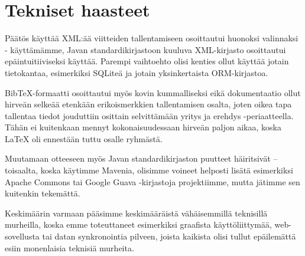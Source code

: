 \documentclass{article}
\begin{document}
\section{Tekniset haasteet}

Päätös käyttää XML:ää viitteiden tallentamiseen osoittautui huonoksi valinnaksi - käyttämämme, Javan standardikirjastoon kuuluva XML-kirjasto osoittautui epäintuitiiviseksi käyttää. Parempi vaihtoehto olisi kenties ollut käyttää jotain tietokantaa, esimerkiksi SQLiteä ja jotain yksinkertaista ORM-kirjastoa.

BibTeX-formaatti osoittautui myös kovin kummalliseksi eikä dokumentaatio ollut hirveän selkeää etenkään erikoismerkkien tallentamisen osalta, joten oikea tapa tallentaa tiedot jouduttiin osittain selvittämään yritys ja erehdys -periaatteella. Tähän ei kuitenkaan mennyt kokonaisuudessaan hirveän paljon aikaa, koska LaTeX oli ennestään tuttu osalle ryhmästä.

Muutamaan otteeseen myös Javan standardikirjaston puutteet häiritsivät -- toisaalta, koska käytimme Mavenia, olisimme voineet helposti lisätä esimerkiksi Apache Commons tai Google Guava -kirjastoja projektiimme, mutta jätimme sen kuitenkin tekemättä.

Keskimäärin varmaan pääsimme keskimääräistä vähäisemmillä teknisillä murheilla, koska emme toteuttaneet esimerkiksi graafista käyttöliittymää, web-sovellusta tai datan synkronointia pilveen, joista kaikista olisi tullut epäilemättä esiin monenlaisia teknisiä murheita.
\end{document}

